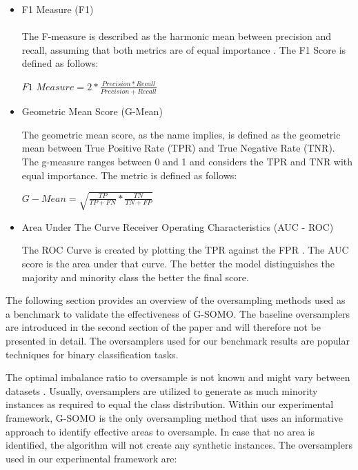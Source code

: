 \documentclass[parskip=full]{scrartcl}
\begin{document}
\begin{itemize}
  \item F1 Measure (F1) \\
  \\
  The F-measure is described as the harmonic mean between precision and recall, assuming that both metrics are of equal importance \cite{Guo2018}. The F1 Score is defined as follows:
  
  \begin{center} $F1$  $Measure= 2 * \frac{Precision * Recall}{Precision + Recall}$ \end{center}
    
  \item Geometric Mean Score (G-Mean)
  
  The geometric mean score, as the name implies, is defined as the geometric mean between True Positive Rate (TPR) and True Negative Rate (TNR). The g-measure ranges between 0 and 1 and considers the TPR and TNR with equal importance. The metric is defined as follows:
  
   \begin{center} $G-Mean=  \sqrt{\frac{TP}{TP + FN} * \frac{TN}{TN + FP}}$ \end{center}
  
  \item Area Under The Curve Receiver Operating Characteristics (AUC - ROC)
  
  The ROC Curve is created by plotting the TPR against the FPR \cite{Hand2009}. The AUC score is the area under that curve. The better the model distinguishes the majority and minority class the better the final score. 

\end{itemize}


The following section provides an overview of the oversampling methods used as a benchmark to validate the effectiveness of G-SOMO. The baseline oversamplers are introduced in the second section of the paper and will therefore not be presented in detail. The oversamplers used for our benchmark results are popular techniques for binary classification tasks.

 The optimal imbalance ratio to oversample is not known and might vary between datasets \cite{Provost2018}. Usually, oversamplers are utilized to generate as much minority instances as required to equal the class distribution. Within our experimental framework, G-SOMO is the only oversampling method that uses an informative approach to identify effective areas to oversample. In case that no area is identified, the algorithm will not create any synthetic instances. The oversamplers used in our experimental framework are:
\end{document}
